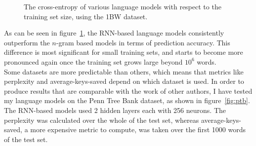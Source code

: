 \documentclass[a4paper, 12pt]{report}
\begin{document}
\begin{figure}[h]
\caption{The cross-entropy of various language models with respect to the training set size, using the 1BW dataset.}
\label{fig:cross_entropy_training_set_size}
\end{figure}

As can be seen in figure~\ref{fig:cross_entropy_training_set_size}, the RNN-based language models consistently outperform the $n$-gram based models in terms of prediction accuracy. This difference is most significant for small training sets, and starts to become more pronounced again once the training set grows large beyond $10^6$ words. \\

Some datasets are more predictable than others, which means that metrics like perplexity and average-keys-saved depend on which dataset is used. In order to produce results that are comparable with the work of other authors, I have tested my language models on the Penn Tree Bank dataset, as shown in figure~\ref{fig:ptb}. The RNN-based models used 2 hidden layers each with 256 neurons. The perplexity was calculated over the whole of the test set, whereas average-keys-saved, a more expensive metric to compute, was taken over the first 1000 words of the test set. \\
\end{document}
